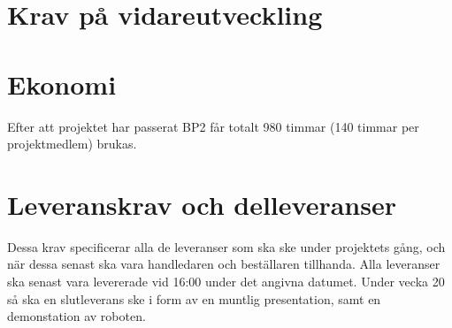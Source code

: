 \documentclass[a4paper,12pt]{article}
\begin{document}
\begin{LIPSkravlista}
\end{LIPSkravlista}



\section{Krav på vidareutveckling}
\begin{LIPSkravlista}
\end{LIPSkravlista}


\section{Ekonomi}
Efter att projektet har passerat BP2 får totalt 980 timmar (140 timmar per projektmedlem) brukas.


\begin{LIPSkravlista}
\end{LIPSkravlista}


\section{Leveranskrav och delleveranser}
Dessa krav specificerar alla de leveranser som ska ske under projektets gång,
och när dessa senast ska vara handledaren och beställaren tillhanda.
Alla leveranser ska senast vara levererade vid 16:00 under det angivna datumet.
Under vecka 20 så ska en slutleverans ske i form av en muntlig presentation, samt en demonstation av roboten.
\end{document}
